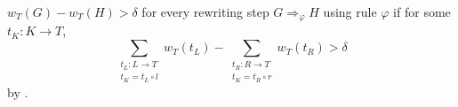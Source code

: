 \documentclass{beamer}
\begin{document}
\begin{frame}{ $w_T(G) - w_T(H) > \delta$ for every rewriting step $G \Rightarrow_\varphi H$ using rule $\varphi$ if}
for some $t_K: K \rightarrow T$,
$$ \sum_{\substack{t_L: L \rightarrow T\\ t_K = t_L \circ l}}
        w_T(t_L) - \sum_{\substack{t_R: R \rightarrow T\\ t_K = t_R \circ r}}
            w_T(t_R) > \delta $$ 
  by \cite[Lemma 5.13]{endrullis2024generalized_arxiv_v2}.
\end{frame}
\end{document}
